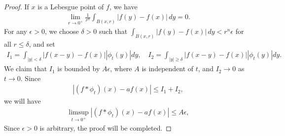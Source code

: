 \documentclass{article}
\numberwithin{equation}{section}
\theoremstyle{plain}
\theoremstyle{definition}
\begin{document}
\begin{proof}
If $x$ is a Lebesgue point of $f$, we have
\begin{align*}
	\lim_{r\to 0^+}\frac{1}{r^n}\int_{B(x,r)}\vert f(y)-f(x)\vert\,dy=0.
\end{align*}
For any $\epsilon>0$, we choose $\delta>0$ such that $\int_{B(x,r)}\vert f(y)-f(x)\vert\,dy<r^n\epsilon$ for all $r\leq\delta$, and set
\begin{align*}
	I_1=\int_{\vert y\vert<\delta}\vert f(x-y)-f(x)\vert\left\vert\phi_t(y)\right\vert dy,\quad I_2=\int_{\vert y\vert\geq\delta}\vert f(x-y)-f(x)\vert\left\vert\phi_t(y)\right\vert dy.
\end{align*}
We claim that $I_1$ is bounded by $A\epsilon$, where $A$ is independent of $t$, and $I_2\to 0$ as $t\to 0$. Since
\begin{align*}
	\left\vert (f*\phi_t)(x)-af(x)\right\vert\leq I_1+I_2,
\end{align*} 
we will have
\begin{align*}
	\limsup_{t\to 0^+}\left\vert (f*\phi_t)(x)-af(x)\right\vert\leq A\epsilon,
\end{align*}
Since $\epsilon>0$ is arbitrary, the proof will be completed.


\end{proof}
\end{document}
